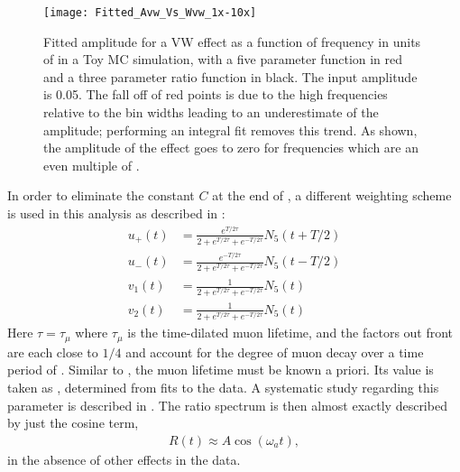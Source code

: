     \begin{figure}
        \centering
        \texttt{[image: Fitted\_Avw\_Vs\_Wvw\_1x-10x]}
        \caption[Cancellation of effect in Ratio Method versus frequency]{Fitted amplitude for a VW effect as a function of frequency in units of \wa in a Toy MC simulation, with a five parameter function in red and a three parameter ratio function in black. The input amplitude is 0.05. The fall off of red points is due to the high frequencies relative to the bin widths leading to an underestimate of the amplitude; performing an integral fit removes this trend. As shown, the amplitude of the effect goes to zero for frequencies which are an even multiple of \wa.}
        \label{fig:CancellationInRatioMethod}
    \end{figure}



 In order to eliminate the constant $C$ at the end of , a different weighting scheme is used in this analysis as described in :
    \begin{equation}
    \begin{aligned}
        u_{+}(t) &= \frac{e^{T/2\tau}}{2 + e^{T/2\tau} + e^{-T/2\tau}} N_{5}(t+T/2) \\
        u_{-}(t) &= \frac{e^{-T/2\tau}}{2 + e^{T/2\tau} + e^{-T/2\tau}} N_{5}(t-T/2) \\
        v_{1}(t) &= \frac{1}{2 + e^{T/2\tau} + e^{-T/2\tau}} N_{5}(t) \\
        v_{2}(t) &= \frac{1}{2 + e^{T/2\tau} + e^{-T/2\tau}} N_{5}(t)
    \label{eqn:fourHistsInText}
    \end{aligned}
    \end{equation}
Here $\tau = \tau_{\mu}$ where $\tau_{\mu}$ is the time-dilated muon lifetime, and the factors out front are each close to $1/4$ and account for the degree of muon decay over a time period of \Tatwo. Similar to \Ta, the muon lifetime must be known a priori. Its value is taken as , determined from fits to the data. A systematic study regarding this parameter is described in . The ratio spectrum is then almost exactly described by just the cosine term,
    \begin{align} \label{eq:threeparamratio}
        R(t) \approx A \cos(\omega_{a}t),
    \end{align}
in the absence of other effects in the data. 





